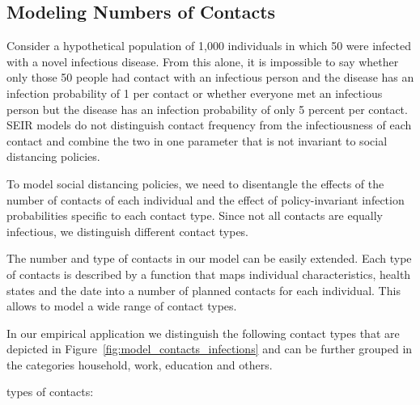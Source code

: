 \subsection{Modeling Numbers of Contacts}
\label{sec:number_of_contacts}

Consider a hypothetical population of 1,000 individuals in which 50 were infected with a
novel infectious disease. From this alone, it is impossible to say whether only
those 50 people had contact with an infectious person and the disease has an infection
probability of 1 per contact or whether everyone met an infectious person but the
disease has an infection probability of only 5 percent per contact. SEIR models do not
distinguish contact frequency from the infectiousness of each contact and
combine the two in one parameter that is not invariant to social distancing policies.

To model social distancing policies, we need to disentangle the effects of the number of
contacts of each individual and the effect of policy-invariant infection probabilities
specific to each contact type. Since not all contacts are equally infectious, we
distinguish different contact types.

The number and type of contacts in our model can be easily extended. Each type of
contacts is described by a function that maps individual characteristics, health states
and the date into a number of planned contacts for each individual. This allows to model
a wide range of contact types.

In our empirical application we distinguish the following  contact types that
are depicted in Figure~\ref{fig:model_contacts_infections} and can be further grouped
in the categories household, work, education and others.

types of contacts:

